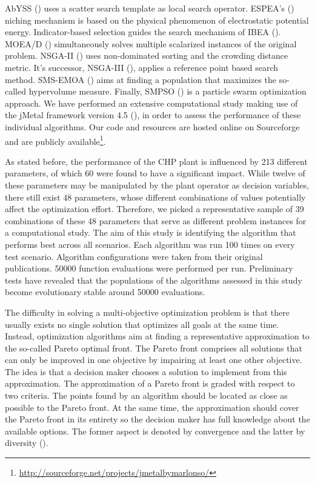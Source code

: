AbYSS (\cite{abyss}) uses a scatter search template as local search operator. ESPEA's (\cite{espea}) niching mechanism is based on the physical phenomenon of electrostatic potential energy. Indicator-based selection guides the search mechanism of IBEA (\cite{ibea}). MOEA/D (\cite{moead2009}) simultaneously solves multiple scalarized instances of the original problem. NSGA-II (\cite{nsga2}) uses non-dominated sorting and the crowding distance metric. It's successor, NSGA-III (\cite{nsga3part1}), applies a reference point based search method. SMS-EMOA (\cite{smsemoa}) aims at finding a population that maximizes the so-called hypervolume measure. Finally, SMPSO (\cite{smpso}) is a particle swarm optimization approach. We have performed an extensive computational study making use of the jMetal framework version 4.5 (\cite{jmetal2}), in order to assess the performance of these individual algorithms. Our code and resources are hosted online on Sourceforge and are publicly available\footnote{\url{http://sourceforge.net/projects/jmetalbymarlonso/}}.

As stated before, the performance of the CHP plant is influenced by 213 different parameters, of which 60 were found to have a significant impact. While twelve of these parameters may be manipulated by the plant operator as decision variables, there still exist 48 parameters, whose different combinations of values potentially affect the optimization effort. Therefore, we picked a representative sample of 39 combinations of these 48 parameters that serve as different problem instances for a computational study. The aim of this study is identifying the algorithm that performs best across all scenarios. Each algorithm was run 100 times on every test scenario. Algorithm configurations were taken from their original publications. \num{50000} function evaluations were performed per run. Preliminary tests have revealed that the populations of the algorithms assessed in this study become evolutionary stable around \num{50000} evaluations.

The difficulty in solving a multi-objective optimization problem is that there usually exists no single solution that optimizes all goals at the same time. Instead, optimization algorithms aim at finding a representative approximation to the so-called Pareto optimal front. The Pareto front comprises all solutions that can only be improved in one objective by impairing at least one other objective. The idea is that a decision maker chooses a solution to implement from this approximation. The approximation of a Pareto front is graded with respect to two criteria. The points found by an algorithm should be located as close as possible to the Pareto front. At the same time, the approximation should cover the Pareto front in its entirety so the decision maker has full knowledge about the available options. The former aspect is denoted by convergence and the latter by diversity (\cite{basicDeb,basicCoello}).

